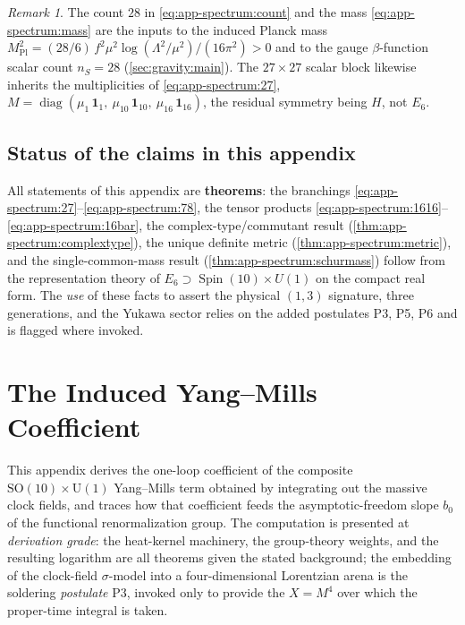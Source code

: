 \documentclass[11pt]{article}
\theoremstyle{plain}
\theoremstyle{definition}
\theoremstyle{remark}
\newtheorem{remark}[theorem]{Remark}
\newcommand{\SO}[1]{\mathrm{SO}(#1)}
\newcommand{\U}[1]{\mathrm{U}(#1)}
\newcommand{\Spin}{\operatorname{Spin}}
\newcommand{\diag}{\operatorname{diag}}
\newcommand{\SOTen}{\SO{10}}
\newcommand{\UOne}{\U{1}}
\begin{document}
\begin{remark}\label{rem:app-spectrum:downstream}
The count $28$ in \eqref{eq:app-spectrum:count} and the mass
\eqref{eq:app-spectrum:mass} are the inputs to the induced Planck mass
$M_{\mathrm{Pl}}^2=(28/6)\,f^2\mu^2\log(\Lambda^2/\mu^2)/(16\pi^2)>0$ and
to the gauge $\beta$-function scalar count $n_S=28$
(\autoref{sec:gravity:main}). The $27\times27$ scalar block likewise
inherits the multiplicities of \eqref{eq:app-spectrum:27},
$M=\diag(\mu_1\,\mathbf 1_1,\ \mu_{10}\,\mathbf 1_{10},\
\mu_{16}\,\mathbf 1_{16})$, the residual symmetry being $H$, not $E_6$.
\end{remark}

\subsection*{Status of the claims in this appendix}
\label{sec:app-spectrum:status}

All statements of this appendix are \textbf{theorems}: the branchings
\eqref{eq:app-spectrum:27}--\eqref{eq:app-spectrum:78}, the tensor
products \eqref{eq:app-spectrum:1616}--\eqref{eq:app-spectrum:16bar}, the
complex-type/commutant result (\autoref{thm:app-spectrum:complextype}),
the unique definite metric (\autoref{thm:app-spectrum:metric}), and the
single-common-mass result (\autoref{thm:app-spectrum:schurmass}) follow
from the representation theory of $E_6\supset\Spin(10)\times U(1)$ on the
compact real form. The \emph{use} of these facts to assert the physical
$(1,3)$ signature, three generations, and the Yukawa sector relies on the
added postulates P3, P5, P6 and is flagged where invoked.


\section{The Induced Yang--Mills Coefficient}
\label{sec:app-ym:main}
\label{app:ym:main}

This appendix derives the one-loop coefficient of the composite
$\SOTen\times\UOne$ Yang--Mills term obtained by integrating out the
massive clock fields, and traces how that coefficient feeds the
asymptotic-freedom slope $b_{0}$ of the functional renormalization group.
The computation is presented at \emph{derivation grade}: the heat-kernel
machinery, the group-theory weights, and the resulting logarithm are all
theorems given the stated background; the embedding of the clock-field
$\sigma$-model into a four-dimensional Lorentzian arena is the soldering
\emph{postulate} P3, invoked only to provide the $X=M^{4}$ over which the
proper-time integral is taken.
\end{document}
